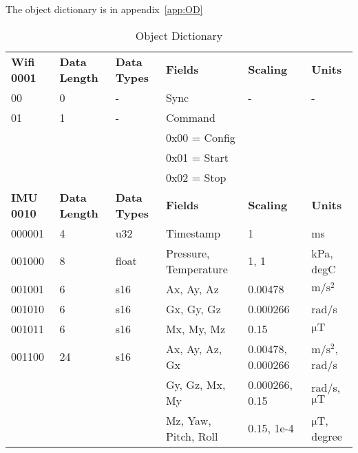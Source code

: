 The object dictionary is in appendix~\ref{app:OD}
\begin{table}[H]
	\centering
	\caption{Object Dictionary}
	\label{tab:OD}
	\begin{tabular}{llllll}
		\textbf{Wifi 0001} & \textbf{Data Length} & \textbf{Data Types} & \textbf{Fields}       & \textbf{Scaling}   & \textbf{Units}                             \\
		00                 & 0                    & -                   & Sync                  & -                  & -                                          \\
		01                 & 1                    & -                   & Command               &                    &                                            \\
		&                      &                     & 0x00 = Config         &                    &                                            \\
		&                      &                     & 0x01 = Start          &                    &                                            \\
		&                      &                     & 0x02 = Stop           &                    &                                            \\
		\textbf{IMU 0010}  & \textbf{Data Length} & \textbf{Data Types} & \textbf{Fields}       & \textbf{Scaling}   & \textbf{Units}                             \\
		000001             & 4                    & u32                 & Timestamp             & 1                  & ms                                         \\
		001000             & 8                    & float               & Pressure, Temperature & 1, 1               & kPa, degC                                  \\
		001001             & 6                    & s16                 & Ax, Ay, Az            & 0.00478            & $\si{\meter \per \second \squared} $        \\
		001010             & 6                    & s16                 & Gx, Gy, Gz            & 0.000266           & rad/s                                      \\
		001011             & 6                    & s16                 & Mx, My, Mz            & 0.15               & $ \si{\micro \tesla} $                       \\
		001100             & 24                   & s16                 & Ax, Ay, Az, Gx        & 0.00478,  0.000266 & $ \si{\meter \per \second \squared} $, rad/s \\
		&                      &                     & Gy, Gz, Mx, My        & 0.000266, 0.15     & rad/s, $ \si{\micro \tesla} $                \\
		&                      &                     & Mz, Yaw, Pitch, Roll  & 0.15, 1e-4         & $ \si{\micro \tesla} $, degree              
	\end{tabular}
\end{table}
